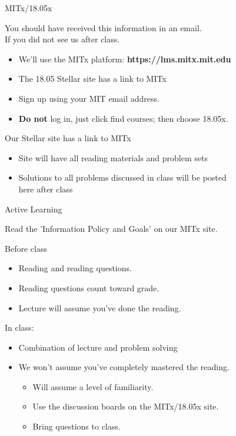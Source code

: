 \begin{frame}{MITx/18.05x}

{\large You should have received this information in an email.\\
If you did not see us after class.}

\bigskip

\begin{itemize}
\item We'll use the MITx platform:  {\bf \color{blue} https://lms.mitx.mit.edu}
\item The 18.05 Stellar site has a link to MITx
\item Sign up using your MIT email address.
\item \textbf{Do not} log in, just click find courses; then choose 18.05x.
\end{itemize}

Our Stellar site has a link to MITx\\

\begin{itemize}
\item Site will have all reading materials and problem sets
\item Solutions to all problems discussed in class will be posted\\ 
here after class
\end{itemize}
\end{frame}

\begin{frame}{Active Learning}

{\large
Read the 'Information Policy and Goals' on our MITx site.

\bigskip

Before class
\begin{itemize}
\item Reading and reading questions.
\item Reading questions count toward grade.
\item Lecture will assume you've done the reading.
\end{itemize}

In class:
\begin{itemize}
\item Combination of lecture and problem solving
\item We won't assume you've completely mastered the reading. 
  \begin{itemize}
  \item Will assume a level of familiarity. 
  \item Use the discussion boards on the MITx/18.05x site.
  \item Bring questions to class.
    \end{itemize}
\end{itemize}
}
\end{frame}

